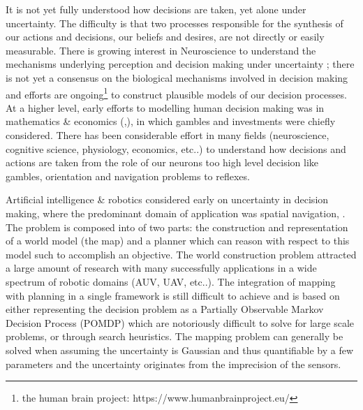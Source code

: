 It is not yet fully understood how decisions are taken, yet alone under uncertainty. The difficulty is that two processes responsible 
for the synthesis of our actions and decisions, our beliefs and desires, are not directly or easily measurable. There is growing interest in 
Neuroscience to understand the mechanisms underlying perception and decision making under uncertainty \cite{decision_un_2013}; there is not 
yet a consensus on the biological mechanisms involved in decision making and efforts are 
ongoing\footnote{the human brain project: https://www.humanbrainproject.eu/} to construct plausible models of our decision processes. 
At a higher level, early efforts to modelling human decision making was in mathematics \& economics 
(\cite{Bernoulli1954},\cite{VonNeumann1944}), in which gambles and investments were chiefly considered. There has been 
considerable effort in many fields (neuroscience, cognitive science, physiology, economics, etc..) to understand how decisions and actions 
are taken from the role of our neurons too high level decision like gambles, orientation and navigation problems to reflexes. 
 


 

Artificial intelligence \& robotics considered early on uncertainty in decision making, 
where the predominant domain of application was spatial navigation, \cite{ActingUncertainty_1996}. The problem is composed 
into of two parts: the construction and representation of a world model (the map) and a planner which can reason with 
respect to this model such to accomplish an objective. The world construction problem attracted a large amount of 
research with many successfully applications in a wide spectrum of robotic domains (AUV, UAV, etc..). The integration of mapping 
with planning in a single framework is still difficult to achieve and is based on either representing the decision problem as a 
Partially Observable Markov Decision Process (POMDP) which are notoriously difficult to solve for large scale problems, or through search heuristics.  
The mapping problem can generally be solved when assuming the uncertainty is Gaussian and thus quantifiable 
by a few parameters and the uncertainty originates from the imprecision of the sensors.

